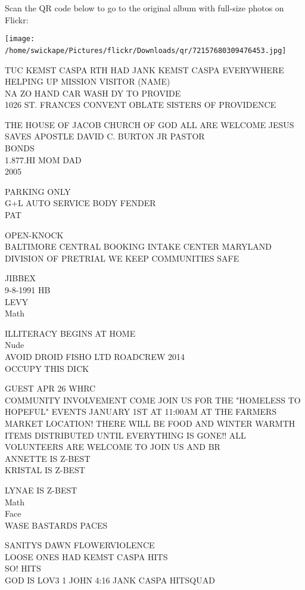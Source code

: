 \documentclass[10pt,letterpaper]{article}
\begin{document}
Scan the QR code below to go to the original album with full-size photos on Flickr:

\texttt{[image: /home/swickape/Pictures/flickr/Downloads/qr/72157680309476453.jpg]}
\

TUC KEMST CASPA RTH HAD JANK KEMST CASPA EVERYWHERE\\
HELPING UP MISSION VISITOR (NAME)\\
NA ZO HAND CAR WASH DY TO PROVIDE\\
1026 ST. FRANCES CONVENT OBLATE SISTERS OF PROVIDENCE

THE HOUSE OF JACOB CHURCH OF GOD ALL ARE WELCOME JESUS SAVES APOSTLE DAVID C. BURTON JR PASTOR\\
BONDS\\
1.877.HI MOM DAD\\
2005

PARKING ONLY\\
G+L AUTO SERVICE BODY FENDER\\
PAT

OPEN{-}KNOCK\\
BALTIMORE CENTRAL BOOKING INTAKE CENTER MARYLAND DIVISION OF PRETRIAL WE KEEP COMMUNITIES SAFE

JIBBEX\\
9{-}8{-}1991 HB\\
LEVY\\
Math

ILLITERACY BEGINS AT HOME\\
Nude\\
AVOID DROID FISHO LTD ROADCREW 2014\\
OCCUPY THIS DICK

GUEST APR 26 WHRC\\
COMMUNITY INVOLVEMENT COME JOIN US FOR THE "HOMELESS TO HOPEFUL" EVENTS JANUARY 1ST AT 11:00AM AT THE FARMERS MARKET LOCATION!  THERE WILL BE FOOD AND WINTER WARMTH ITEMS DISTRIBUTED UNTIL EVERYTHING IS GONE!!  ALL VOLUNTEERS ARE WELCOME TO JOIN US AND BR\\
ANNETTE IS Z{-}BEST\\
KRISTAL IS Z{-}BEST

LYNAE IS Z{-}BEST\\
Math\\
Face\\
WASE BASTARDS PACES

SANITYS DAWN FLOWERVIOLENCE\\
LOOSE ONES HAD KEMST CASPA HITS\\
SO!  HITS\\
GOD IS LOV3 1 JOHN 4:16 JANK CASPA HITSQUAD
\end{document}
